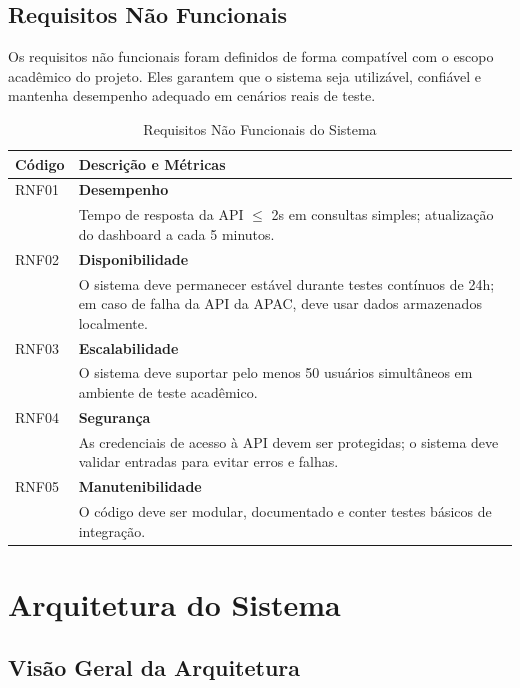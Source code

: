 \subsection{Requisitos Não Funcionais}

Os requisitos não funcionais foram definidos de forma compatível com o escopo acadêmico do projeto. Eles garantem que o sistema seja utilizável, confiável e mantenha desempenho adequado em cenários reais de teste.

\begin{table}[H]
\centering
\caption{Requisitos Não Funcionais do Sistema}
\label{tab:requisitos-nao-funcionais}
\begin{tabular}{p{}p{}}
\toprule
\textbf{Código} & \textbf{Descrição e Métricas} \\
\midrule
RNF01 & \textbf{Desempenho} \\
& Tempo de resposta da API \(\leq\) 2s em consultas simples; atualização do dashboard a cada 5 minutos. \\
\midrule
RNF02 & \textbf{Disponibilidade} \\
& O sistema deve permanecer estável durante testes contínuos de 24h; em caso de falha da API da APAC, deve usar dados armazenados localmente. \\
\midrule
RNF03 & \textbf{Escalabilidade} \\
& O sistema deve suportar pelo menos 50 usuários simultâneos em ambiente de teste acadêmico. \\
\midrule
RNF04 & \textbf{Segurança} \\
& As credenciais de acesso à API devem ser protegidas; o sistema deve validar entradas para evitar erros e falhas. \\
\midrule
RNF05 & \textbf{Manutenibilidade} \\
& O código deve ser modular, documentado e conter testes básicos de integração. \\
\bottomrule
\end{tabular}
\end{table}

\section{Arquitetura do Sistema}

\subsection{Visão Geral da Arquitetura}

